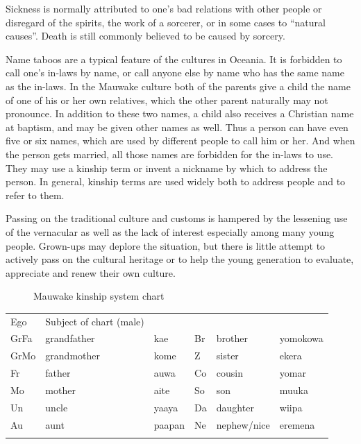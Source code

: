 Sickness is normally attributed to one's bad relations with other people or disregard of the spirits, the work of a sorcerer, or in some cases to ``natural causes''. Death is still commonly believed to be caused by sorcery.

Name taboos are a typical feature of the cultures in Oceania.  It is forbidden to call one's in-laws by name, or call anyone else by name who has the same name as the in-laws.  In the Mauwake culture both of the parents give a child the name of one of his or her own relatives, which the other parent naturally may not pronounce.  In addition to these two names, a child also receives a Christian name at baptism, and may be given other names as well.  Thus a person can have even five or six names, which are used by different people to call him or her.  And when the person gets married, all those names are forbidden for the in-laws to use.  They may use a kinship term or invent a nickname by which to address the person. In general, kinship terms are used widely both to address people and to refer to them.

Passing on the traditional culture and customs is hampered by the lessening use of the vernacular as well as the lack of interest especially among many young people. Grown-ups may deplore the situation, but there is little attempt to actively pass on the cultural heritage or to help the young generation to evaluate, appreciate and renew their own culture. 



\begin{figure}

\caption{Mauwake kinship system chart}
\label{fig:1:kinship}
\end{figure}
 


\begin{table}
\begin{tabular}{llllll}


\lsptoprule

Ego 	& Subject of chart (male) &&&& 		\\		
GrFa	& grandfather							& kae & 	Br &	brother 	& yomokowa\\
GrMo	& grandmother							& kome &	Z &		sister		& ekera\\
Fr		&	father									&	auwa &	Co &	cousin		& yomar\\
Mo		&	mother									& aite &	So &	son				& muuka\\
Un		&	uncle										& yaaya & Da &	daughter	& wiipa\\
Au		&	aunt										& paapan& Ne &	nephew/nice&eremena\\

\lspbottomrule

\end{tabular}
\end{table}



